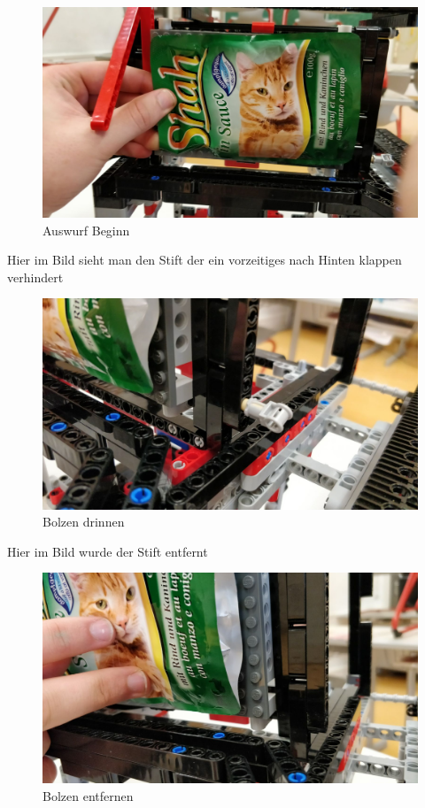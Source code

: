 \documentclass[a4paper,12pt]{scrartcl}
\begin{document}
\begin{figure}[H]
\begin{center}
\includegraphics[width=13cm]{Bilder/Ablauf_1_png/Auswurf_1}
\caption{Auswurf Beginn}
\end{center}
\end{figure}

Hier im Bild sieht man den Stift der ein vorzeitiges nach Hinten klappen verhindert

\begin{figure}[H]
\begin{center}
\includegraphics[width=13cm]{Bilder/Ablauf_1_png/Auswurf_2}
\caption{Bolzen drinnen}
\end{center}
\end{figure}

Hier im Bild wurde der Stift entfernt 

\begin{figure}[H]
\begin{center}
\includegraphics[width=13cm]{Bilder/Ablauf_1_png/Auswurf_3}
\caption{Bolzen entfernen}
\end{center}
\end{figure}
\end{document}
